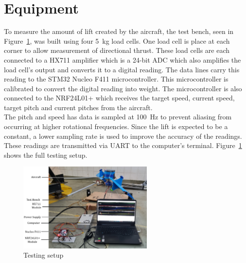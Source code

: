     \section{Equipment}
        To measure the amount of lift created by the aircraft, the test bench, seen in Figure~\ref{fig: testing_setup}, was built using four 5~kg load cells. One load cell is place at each corner to allow measurement of directional thrust. These load cells are each connected to a HX711 amplifier which is a 24-bit ADC which also amplifies the load cell's output and converts it to a digital reading. The data lines carry this reading to the STM32 Nucleo F411  microcontroller. This microcontroller is calibrated to convert the digital reading into weight. The microcontroller is also connected to the NRF24L01+ which receives the target speed, current speed, target pitch and current pitches from the aircraft. \\
        The pitch and speed has data is sampled at 100~Hz to prevent aliasing from occurring at higher rotational frequencies. Since the lift is expected to be a constant, a lower sampling rate is used to improve the accuracy of the readings. These readings are transmitted via UART to the computer's terminal. 
        Figure~\ref{fig: testing_setup} shows the full testing setup.
            \begin{figure}[h]
                \centering
                \includegraphics*[width = 0.6\textwidth]{figs/Experiments/Testing_Setup_Labeled.png}
                \caption{Testing setup}
                \label{fig: testing_setup}
            \end{figure}
